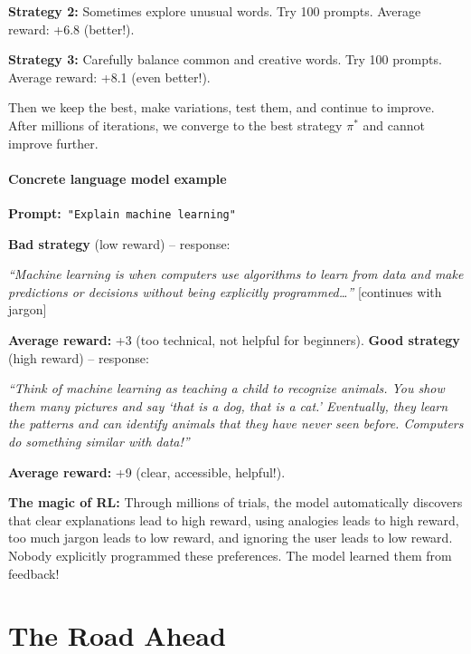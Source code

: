 \begin{chapterenv}
\textbf{Strategy 2:} Sometimes explore unusual words. Try 100 prompts. Average reward: +6.8 (better!).

\textbf{Strategy 3:} Carefully balance common and creative words. Try 100 prompts. Average reward: +8.1 (even better!).

Then we keep the best, make variations, test them, and continue to improve. After millions of iterations, we converge to the best strategy $\pi^*$ and cannot improve further.

\paragraph{Concrete language model example}

\begin{examplebox}
\textbf{Prompt:}~\texttt{"Explain machine learning"}

\smallskip
\textbf{Bad strategy} (low reward) -- response:

\textit{``Machine learning is when computers use algorithms to learn from data and make predictions or decisions without being explicitly programmed\ldots''} [continues with jargon]

\smallskip
\textbf{Average reward:} +3 (too technical, not helpful for beginners).
\tcblower
\textbf{Good strategy} (high reward) -- response:

\textit{``Think of machine learning as teaching a child to recognize animals. You show them many pictures and say `that is a dog, that is a cat.' Eventually, they learn the patterns and can identify animals that they have never seen before. Computers do something similar with data!''}

\smallskip
\textbf{Average reward:} +9 (clear, accessible, helpful!).
\end{examplebox}

\begin{infobox}
\textbf{The magic of RL:} Through millions of trials, the model automatically discovers that clear explanations lead to high reward, using analogies leads to high reward, too much jargon leads to low reward, and ignoring the user leads to low reward. Nobody explicitly programmed these preferences. The model learned them from feedback!
\end{infobox}

\section{The Road Ahead}


\end{chapterenv}

